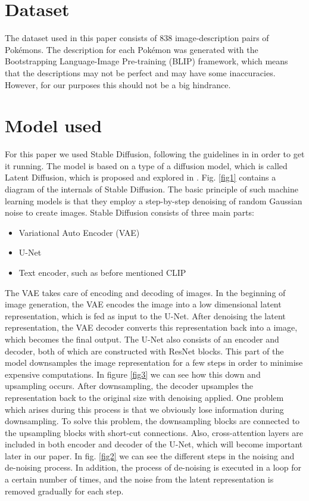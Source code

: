\documentclass[conference]{IEEEtran}
\begin{document}
\section{Dataset}
The dataset used in this paper \cite{pinkney2022pokemon} consists of 838 image-description pairs of Pokémons. The description for each Pokémon was generated with the Bootstrapping Language-Image Pre-training (BLIP) framework, which means that the descriptions may not be perfect and may have some inaccuracies. However, for our purposes this should not be a big hindrance.

\section{Model used}
For this paper we used Stable Diffusion, following the guidelines in \cite{patil2022stable} in order to get it running. The model is based on a type of a diffusion model, which is called Latent Diffusion, which is proposed and explored in \cite{diffus}. Fig. \ref{fig1} contains a diagram of the internals of Stable Diffusion. The basic principle of such machine learning models is that they employ a step-by-step denoising of random Gaussian noise to create images. Stable Diffusion consists of three main parts:
\begin{itemize}
\item Variational Auto Encoder (VAE)
\item U-Net
\item Text encoder, such as before mentioned CLIP
\end{itemize}
The VAE takes care of encoding and decoding of images. In the beginning of image generation, the VAE encodes the image into a low dimensional latent representation, which is fed as input to the U-Net. After denoising the latent representation, the VAE decoder converts this representation back into a image, which becomes the final output. The U-Net also consists of an encoder and decoder, both of which are constructed with ResNet blocks. This part of the model downsamples the image representation for a few steps in order to minimise expensive computations. In figure \ref{fig3} we can see how this down and upsampling occurs. After downsampling, the decoder upsamples the representation back to the original size with denoising applied. One problem which arises during this process is that we obviously lose information during downsampling. To solve this problem, the downsampling blocks are connected to the upsampling blocks with short-cut connections. Also, cross-attention layers are included in both encoder and decoder of the U-Net, which will become important later in our paper. In fig. \ref{fig2} we can see the different steps in the noising and de-noising process. In addition, the process of de-noising is executed in a loop for a certain number of times, and the noise from the latent representation is removed gradually for each step.
\end{document}
